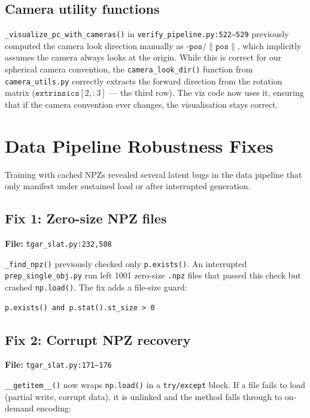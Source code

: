 \subsection{Camera utility functions}

\texttt{\_visualize\_pc\_with\_cameras()} in
\texttt{verify\_pipeline.py:522--529} previously computed the camera
look direction manually as $\texttt{-pos} / \|\texttt{pos}\|$, which
implicitly assumes the camera always looks at the origin. While this is
correct for our spherical camera convention, the
\texttt{camera\_look\_dir()} function from \texttt{camera\_utils.py}
correctly extracts the forward direction from the rotation matrix
($\texttt{extrinsics}[2, :3]$ --- the third row). The viz code now
uses it, ensuring that if the camera convention ever changes, the
visualisation stays correct.

\section{Data Pipeline Robustness Fixes}

Training with cached NPZs revealed several latent bugs in the data pipeline
that only manifest under sustained load or after interrupted generation.

\subsection{Fix 1: Zero-size NPZ files}

\textbf{File:} \texttt{tgar\_slat.py:232,508}

\texttt{\_find\_npz()} previously checked only \texttt{p.exists()}. An
interrupted \texttt{prep\_single\_obj.py} run left 1001 zero-size
\texttt{.npz} files that passed this check but crashed
\texttt{np.load()}. The fix adds a file-size guard:

\begin{lstlisting}
p.exists() and p.stat().st_size > 0
\end{lstlisting}

\subsection{Fix 2: Corrupt NPZ recovery}

\textbf{File:} \texttt{tgar\_slat.py:171--176}

\texttt{\_\_getitem\_\_()} now wraps \texttt{np.load()} in a
\texttt{try/except} block. If a file fails to load (partial write, corrupt
data), it is unlinked and the method falls through to on-demand encoding:

